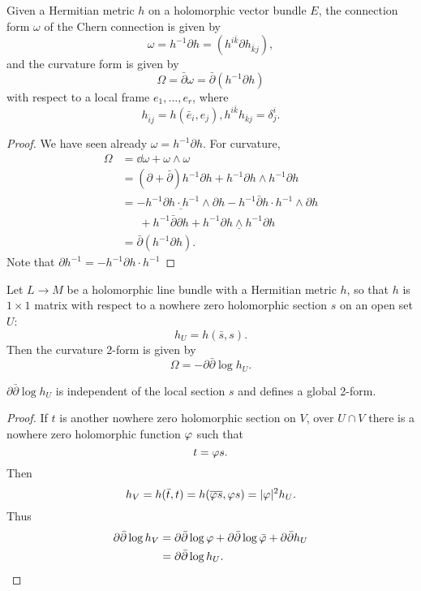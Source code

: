 \documentclass[12pt]{article}
\begin{document}
\ifdefined\FullBook{}\else
\begin{theorem}
  Given a Hermitian metric \(h\) on a holomorphic vector bundle \(E\), the connection
  form \(\omega\) of the Chern connection is given by \[
    \omega=h^{-1}\partial h=\left(h^{i\bar{k}}\partial h_{\bar{k}j}\right)
  ,\] and the curvature form is given by \[
    \boxed{\Omega=\bar{\partial}\omega=\bar{\partial}(h^{-1}\partial h)}
  \] with respect to a local frame \(e_1,\ldots,e_r\), where \[
    h_{\bar{i}j}=h(\bar{e}_i,e_j),h^{i\bar{k}}h_{\bar{k}j}=\delta^i_j
  .\] 
\end{theorem}
\begin{proof}
  We have seen already \(\omega=h^{-1}\partial h\). For curvature,
  \begin{align*}
    \Omega&=\dd{\omega}+\omega\wedge \omega \\ 
    &=(\partial+\bar{\partial})h^{-1}\partial h
    +h^{-1}\partial h\wedge h^{-1}\partial h \\
    &=\underline{-h^{-1}\partial h\cdot h^{-1}\wedge \partial h}
    -h^{-1}\bar{\partial}h\cdot h^{-1}\wedge \partial h \\
    &\phantom{=\ } +h^{-1}\bar{\partial}\partial h
    +\underline{h^{-1}\partial h\wedge h^{-1}\partial h} \\
    &=\bar{\partial}(h^{-1}\partial h)
  .\end{align*}
  Note that \(\partial h^{-1}=-h^{-1}\partial h\cdot h^{-1}\)
\end{proof}
\fi

\begin{corollary}
  Let \(L\to M\) be a holomorphic line bundle with a Hermitian metric \(h\), so that
  \(h\) is \(1\times 1\) matrix with respect to a nowhere zero holomorphic section
  \(s\) on an open set \(U\): \[
    h_U=h(\bar{s},s)
  .\] Then the curvature 2-form is given by \[
    \Omega=-\partial\bar{\partial}\log h_U
  .\] 
\end{corollary}

\begin{lemma}
  \(\partial\bar{\partial}\log h_U\) is independent of the local section \(s\) and
  defines a global 2-form.
\end{lemma}
\begin{proof}
  If \(t\) is another nowhere zero holomorphic section on \(V\), over \(U\cap V\) there
  is a nowhere zero holomorphic function \(\varphi\) such that \[
    t=\varphi s
  .\] Then \[
    h_V=h(\bar{t},t)=h(\overline{\varphi s},\varphi s)=|\varphi|^2 h_U
  .\] Thus
  \begin{align*}
    \partial\bar{\partial}\log h_V&=\partial\bar{\partial}\log\varphi+
    \partial\bar{\partial}\log \bar{\varphi}+\partial\bar{\partial}h_U \\
    &=\partial\bar{\partial}\log h_U
  .\end{align*} 
\end{proof}
\end{document}
